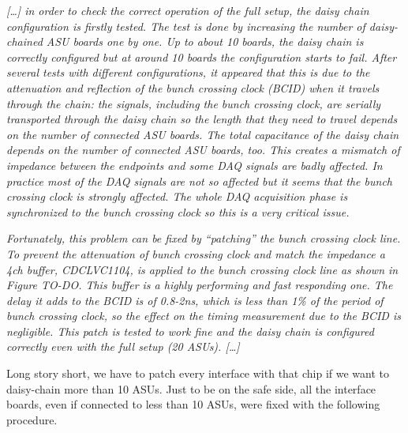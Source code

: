 \textit{[\dots] in order to check the correct operation of the full setup, the
  daisy chain configuration is firstly tested. The test is done by increasing
  the number of daisy-chained ASU boards one by one. Up to about 10 boards, the
  daisy chain is correctly configured but at around 10 boards the configuration
  starts to fail. After several tests with different configurations, it appeared
  that this is due to the attenuation and reflection of the bunch crossing clock
  (BCID) when it travels through the chain: the signals, including the bunch
  crossing clock, are serially transported through the daisy chain so the length
  that they need to travel depends on the number of connected ASU boards. The
  total capacitance of the daisy chain depends on the number of connected ASU
  boards, too. This creates a mismatch of impedance between the endpoints and
  some DAQ signals are badly affected. In practice most of the DAQ signals are
  not so affected but it seems that the bunch crossing clock is strongly
  affected. The whole DAQ acquisition phase is synchronized to the bunch
  crossing clock so this is a very critical issue.}

\textit{Fortunately, this problem can be fixed by ``patching'' the bunch
  crossing clock line. To prevent the attenuation of bunch crossing clock and
  match the impedance a 4ch buffer,
  CDCLVC1104\cite{Texas-Instruments:CDCLVC11xx}, is applied to the bunch
  crossing clock line as shown in Figure TO-DO. This buffer is a highly
  performing and fast responding one. The delay it adds to the BCID is of
  0.8-2ns, which is less than 1\% of the period of bunch crossing clock, so the
  effect on the timing measurement due to the BCID is negligible. This patch is
  tested to work fine and the daisy chain is configured correctly even with the
  full setup (20 ASUs). [\dots]}

Long story short, we have to patch every interface with that chip if we want to
daisy-chain more than 10 ASUs. Just to be on the safe side, all the interface
boards, even if connected to less than 10 ASUs, were fixed with the following
procedure.


